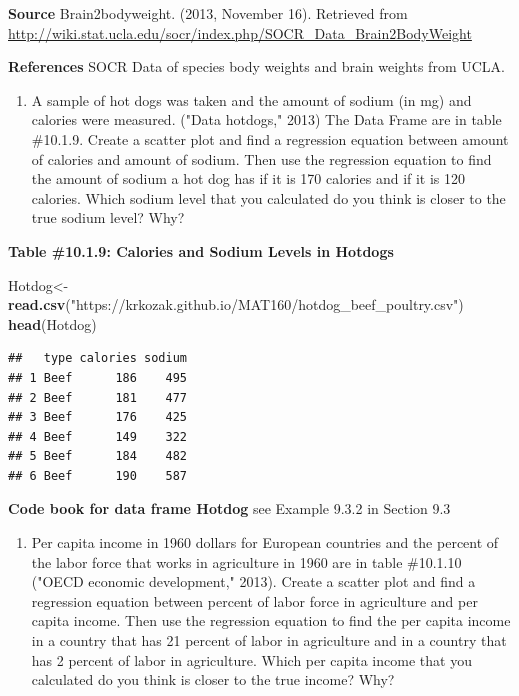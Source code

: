 \documentclass[
]{book}
\newenvironment{Shaded}{\begin{snugshade}}{\end{snugshade}}
\newcommand{\KeywordTok}[1]{\textcolor[rgb]{0.13,0.29,0.53}{\textbf{#1}}}
\newcommand{\NormalTok}[1]{#1}
\newcommand{\StringTok}[1]{\textcolor[rgb]{0.31,0.60,0.02}{#1}}
\providecommand{\tightlist}{%
  \setlength{\itemsep}{0pt}\setlength{\parskip}{0pt}}
\begin{document}
\textbf{Source}
Brain2bodyweight. (2013, November 16). Retrieved from
\url{http://wiki.stat.ucla.edu/socr/index.php/SOCR_Data_Brain2BodyWeight}

\textbf{References}
SOCR Data of species body weights and brain weights from UCLA.

\begin{enumerate}
\def\labelenumi{\arabic{enumi}.}
\setcounter{enumi}{6}
\tightlist
\item
  A sample of hot dogs was taken and the amount of sodium (in mg) and calories were measured. ("Data hotdogs," 2013) The Data Frame are in table \#10.1.9. Create a scatter plot and find a regression equation between amount of calories and amount of sodium. Then use the regression equation to find the amount of sodium a hot dog has if it is 170 calories and if it is 120 calories. Which sodium level that you calculated do you think is closer to the true sodium level? Why?
\end{enumerate}

\textbf{Table \#10.1.9: Calories and Sodium Levels in Hotdogs}

\begin{Shaded}
\begin{Highlighting}[]
\NormalTok{Hotdog<-}\KeywordTok{read.csv}\NormalTok{(}\StringTok{"https://krkozak.github.io/MAT160/hotdog_beef_poultry.csv"}\NormalTok{)}
\KeywordTok{head}\NormalTok{(Hotdog)}
\end{Highlighting}
\end{Shaded}

\begin{verbatim}
##   type calories sodium
## 1 Beef      186    495
## 2 Beef      181    477
## 3 Beef      176    425
## 4 Beef      149    322
## 5 Beef      184    482
## 6 Beef      190    587
\end{verbatim}

\textbf{Code book for data frame Hotdog} see Example 9.3.2 in Section 9.3

\begin{enumerate}
\def\labelenumi{\arabic{enumi}.}
\setcounter{enumi}{7}
\tightlist
\item
  Per capita income in 1960 dollars for European countries and the percent of the labor force that works in agriculture in 1960 are in table \#10.1.10 ("OECD economic development," 2013). Create a scatter plot and find a regression equation between percent of labor force in agriculture and per capita income. Then use the regression equation to find the per capita income in a country that has 21 percent of labor in agriculture and in a country that has 2 percent of labor in agriculture. Which per capita income that you calculated do you think is closer to the true income? Why?
\end{enumerate}
\end{document}
